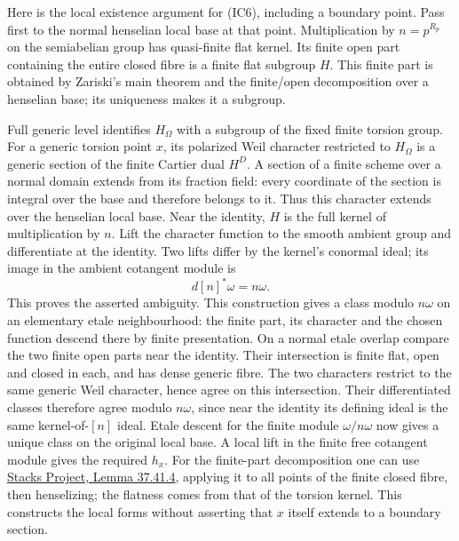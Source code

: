 Here is the local existence argument for (IC6),
including a boundary point.
Pass first to the normal henselian local base at
that point. Multiplication by \(n=p^{R_p}\) on the
semiabelian group has quasi-finite flat kernel.
Its finite open part containing the entire closed
fibre is a finite flat subgroup \(H\).
This finite part is obtained by Zariski's main
theorem and the finite/open decomposition over a
henselian base; its uniqueness makes it a subgroup.

Full generic level identifies \(H_\Omega\) with a
subgroup of the fixed finite torsion group.
For a generic torsion point \(x\), its polarized
Weil character restricted to \(H_\Omega\) is a
generic section of the finite Cartier dual \(H^D\).
A section of a finite scheme over a normal domain
extends from its fraction field: every coordinate
of the section is integral over the base and
therefore belongs to it. Thus this character
extends over the henselian local base.
Near the identity, \(H\) is the full kernel of
multiplication by \(n\).
Lift the character function to the smooth ambient
group and differentiate at the identity.
Two lifts differ by the kernel's conormal ideal;
its image in the ambient cotangent module is
\[
                         d[n]^*\omega=n\omega .
\]
This proves the asserted ambiguity.
This construction gives a class modulo \(n\omega\)
on an elementary etale neighbourhood: the finite
part, its character and the chosen function descend
there by finite presentation.
On a normal etale overlap compare the two finite
open parts near the identity.
Their intersection is finite flat, open and closed
in each, and has dense generic fibre.
The two characters restrict to the same generic
Weil character, hence agree on this intersection.
Their differentiated classes therefore agree modulo
\(n\omega\), since near the identity its defining
ideal is the same kernel-of-\([n]\) ideal.
Etale descent for the finite module
\(\omega/n\omega\) now gives a unique class on the
original local base.
A local lift in the finite free cotangent module
gives the required \(h_x\).
For the finite-part decomposition one can use
\href{https://stacks.math.columbia.edu/tag/02LN}
{Stacks Project, Lemma 37.41.4}, applying it to all
points of the finite closed fibre, then henselizing;
the flatness comes from that of the torsion kernel.
This constructs the local forms without asserting
that \(x\) itself extends to a boundary section.

